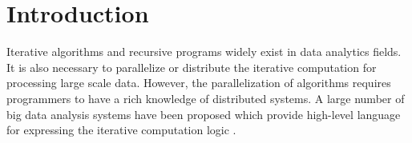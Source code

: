 \section{Introduction}
Iterative algorithms and recursive programs widely exist in data analytics fields. It is also necessary to parallelize or distribute the iterative computation for processing large scale data. However, the parallelization of algorithms requires programmers to have a rich knowledge of distributed systems. A large number of big data analysis systems have been proposed which provide high-level language for expressing the iterative computation logic \cite{Dean:2004:MSD:1251254.1251264,giraph,maiter,Fan:2017:PSG:3035918.3035942,Malewicz2010Pregel,DBLP:journals/corr/GonzalezBJFHGS15,8017445,Low:2012:DGF:2212351.2212354,Han:2015:GUB:2777598.2777604,grace}.


